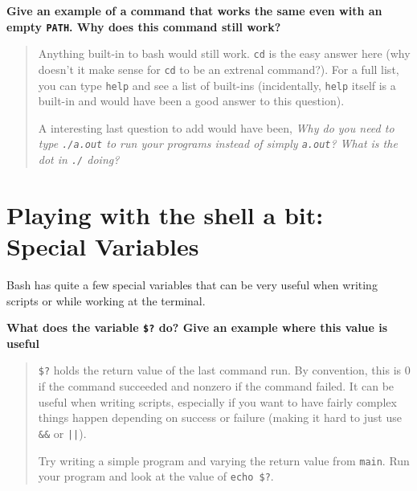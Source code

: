 \documentclass{article}
\begin{document}
\textbf{Give an example of a command that works the same even with an empty
\texttt{PATH}. Why does this command still work?}
\begin{quote}
  \color{violet}
  Anything built-in to bash would still work. \texttt{cd} is the easy answer
  here (why doesn't it make sense for \texttt{cd} to be an extrenal command?).
  For a full list, you can type \texttt{help} and see a list of built-ins
  (incidentally, \texttt{help} itself is a built-in and would have been a
  good answer to this question).

  A interesting last question to add would have been, \emph{Why do you need to
    type \texttt{./a.out} to run your programs instead of simply
  \texttt{a.out}? What is the dot in \texttt{./} doing?}
\end{quote}


\section{Playing with the shell a bit: Special Variables}

Bash has quite a few special variables that can be very useful when writing
scripts or while working at the terminal.

\textbf{What does the variable \texttt{\$?} do? Give an example where this
value is useful}
\begin{quote}
  \color{violet}
  \texttt{\$?} holds the return value of the last command run. By convention,
  this is 0 if the command succeeded and nonzero if the command failed.
  It can be useful when writing scripts, especially if you want to have fairly
  complex things happen depending on success or failure (making it hard to
  just use \texttt{\&\&} or \texttt{||}).

  Try writing a simple program and varying the return value from
  \texttt{main}. Run your program and look at the value of \texttt{echo \$?}.
\end{quote}
\end{document}
